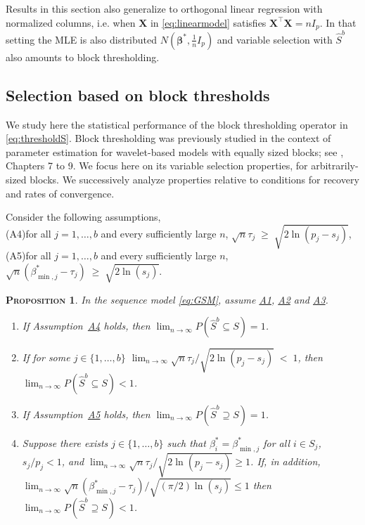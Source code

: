 \documentclass[bj,authoryear]{imsart}
\theoremstyle{plain}
\newtheorem{prop}[thm]{\textsc{Proposition}}
\newcommand{\bs}{\boldsymbol}
\begin{document}
Results in this section also generalize to orthogonal linear regression with normalized columns, i.e. when $\bs X$ in \eqref{eq:linearmodel} satisfies $\bs X^\top \bs X=n I_p$. In that setting the MLE is also distributed $N(\bs \beta^*,\tfrac{1}{n}I_p)$ and %
variable selection with $\hat{S}^b$ also amounts to block thresholding.

\subsection{Selection based on block thresholds}
\label{ssec:block_thresholds}


We study here the statistical performance of the block thresholding operator in \eqref{eq:thresholdS}. Block thresholding was previously studied in the context of parameter estimation for wavelet-based models with equally sized blocks; see \cite{johnstone}, Chapters 7 to 9.
We focus here on its variable selection properties, for arbitrarily-sized blocks. We successively analyze properties relative to conditions for recovery and rates of convergence. 

Consider the following assumptions,\\
\hypertarget{lab:A4}{(A4)}\quad for all $j=1,\ldots,b$ and every sufficiently large $n$,\;\; $\sqrt{n}\tau_j \;\geq\;  \sqrt{2\ln(p_j-s_j)}$,\\[5pt]
\hypertarget{lab:A5}{(A5)}\quad for all $j=1,\ldots,b$ and 
every sufficiently large $n$, \;
	 $\sqrt{n}(\beta_{\min,j}^* - \tau_j) \;\geq\; \sqrt{2\ln(s_j)}$.

\begin{prop}\label{prop:suffnecblockthresh} In the
sequence model \eqref{eq:GSM}, assume \hyperlink{lab:A1}{A1}, \hyperlink{lab:A2}{A2} and \hyperlink{lab:A3}{A3}.
\begin{enumerate}[label=(\roman*)]
    \item If Assumption~\hyperlink{lab:A4}{A4} holds, then 
$\lim_{n \rightarrow \infty} P(\hat{S}^{b}\subseteq S) = 1$.
\item If for some $j\in\{1,\ldots,b\}$\; $
\lim_{n\to \infty} \sqrt{n}\tau_j/\sqrt{2\ln(p_j-s_j)} \;<\;1$,
then $\lim_{n \rightarrow \infty} P(\hat{S}^{b}\subseteq S ) <1$.
\item If Assumption~\hyperlink{lab:A5}{A5} holds, then
$\lim_{n \rightarrow \infty} P(\hat{S}^{b}\supseteq  S)= 1$.
\item Suppose there exists $j\in \{1,\ldots,b\}$ such that  $\beta^*_i=\beta_{\min,j}^*$ for all $i \in S_j$, $s_j/p_j<1$, and $\lim_{n\to \infty} \sqrt{n}\tau_j/\sqrt{2\ln(p_j-s_j)}\geq1$. If, in addition, $\lim_{n\to \infty} \sqrt{n}(\beta_{\min,j}^*-\tau_j)/\sqrt{(\pi/2)\ln(s_j)}\leq 1$
then $\lim_{n \rightarrow \infty} P(\hat S^{b}\supseteq S ) < 1$.
\end{enumerate}
\end{prop}
\end{document}
